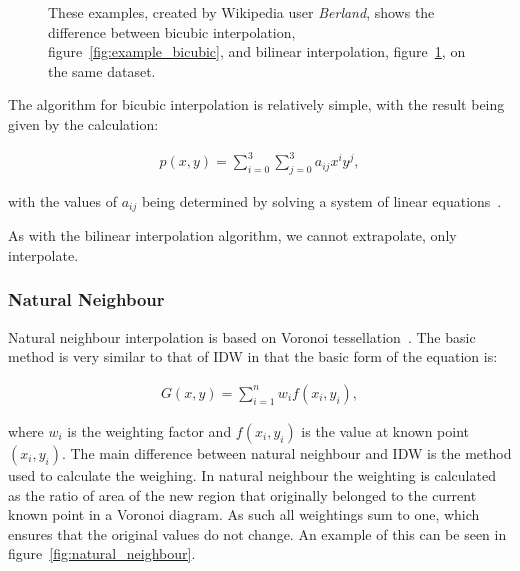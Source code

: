 \begin{figure}[H]
\begin{subfigure}{.5\textwidth}
                    \caption{}
                    \label{fig:example_bilinear}
                \end{subfigure}
                \caption{These examples, created by Wikipedia user \emph{Berland}, shows the difference between bicubic interpolation, figure~\ref{fig:example_bicubic}, and bilinear interpolation, figure~\ref{fig:example_bilinear}, on the same dataset.}
                \label{fig:bicubic_vs_bilinear}
            \end{figure}

            The algorithm for bicubic interpolation is relatively simple, with the result being given by the calculation:

            \begin{align*}
                p(x,y) = \sum_{i=0}^{3}{\sum_{j=0}^{3}{a_{ij}x^{i}y^{j}}},
            \end{align*}

            with the values of $a_{ij}$ being determined by solving a system of linear equations~\cite{bicubicorigins}.

            As with the bilinear interpolation algorithm, we cannot extrapolate, only interpolate. 

        \subsubsection{Natural Neighbour}\label{background_interpolation_methods_naturalneighbour}

            Natural neighbour interpolation is based on Voronoi tessellation~\cite{multivariatedata}. The basic method is very similar to that of IDW in that the basic form of the equation is:

            \begin{align*}
                G(x,y) = \sum_{i=1}^{n}{w_{i}f(x_{i},y_{i})}, 
            \end{align*}

            where $w_{i}$ is the weighting factor and $f(x_{i},y_{i})$ is the value at known point $(x_{i},y_{i})$. The main difference between natural neighbour and IDW is the method used to calculate the weighing. In natural neighbour the weighting is calculated as the ratio of area of the new region that originally belonged to the current known point in a Voronoi diagram. As such all weightings sum to one, which ensures that the original values do not change. An example of this can be seen in figure~\ref{fig:natural_neighbour}.

